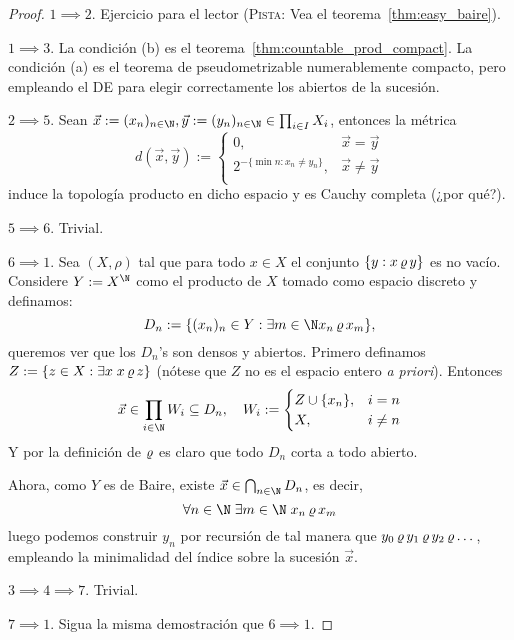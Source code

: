 \documentclass[topologia-analisis.tex]{subfiles}
\begin{document}
\begin{proof}
	$1\implies 2$. Ejercicio para el lector (\textsc{Pista:} Vea el teorema~\ref{thm:easy_baire}).
	\par
	$1\implies 3$. La condición (b) es el teorema~\ref{thm:countable_prod_compact}.
	La condición (a) es el teorema de pseudometrizable numerablemente compacto, pero empleando el DE para elegir correctamente los abiertos
	de la sucesión.

	$2\implies 5$. Sean $\vec x := (x_n)_{n\in\N}, \vec y := (y_n)_{n\in\N} \in \prod_{i\in I} X_i$, entonces la métrica
	$$ d( \vec x, \vec y ) :=
	\begin{cases}
		0, & \vec x = \vec y \\
		2^{-\{\min n : x_n \ne y_n\}}, & \vec x \ne \vec y \\
	\end{cases} $$
	induce la topología producto en dicho espacio y es Cauchy completa (¿por qué?).

	$5 \implies 6$. Trivial.
	\par
	$6 \implies 1$. Sea $(X, \rho)$ tal que para todo $x \in X$ el conjunto $\{ y : x\operatorname{\varrho} y \}$ es no vacío.
	Considere $Y := X^\N$ como el producto de $X$ tomado como espacio discreto y definamos:
	$$ D_n := \{ (x_n)_n \in Y : \exists m\in\N x_n\orho x_m \}, $$
	queremos ver que los $D_n$'s son densos y abiertos.
	Primero definamos $Z := \{ z\in X : \exists x \; x\operatorname{\varrho} z \}$ (nótese que $Z$ no es el espacio entero \textit{a priori}).
	Entonces
	$$ \vec x \in \prod_{i\in\N} W_i \subseteq D_n, \quad
	W_i :=
	\begin{cases}
		Z\cup\{x_n\}, &i = n \\
		X, &i \ne n
	\end{cases} $$
	Y por la definición de $\operatorname{\varrho}$ es claro que todo $D_n$ corta a todo abierto.

	Ahora, como $Y$ es de Baire, existe $\vec x \in \bigcap_{n\in\N} D_n$, es decir,
	$$ \forall n\in\N\; \exists m\in\N \; x_n \orho x_m $$
	luego podemos construir $y_n$ por recursión de tal manera que $y_0\operatorname{\varrho} y_1\operatorname{\varrho} y_2\operatorname{\varrho}\dots$,
	empleando la minimalidad del índice sobre la sucesión $\vec x$.

	$3\implies 4\implies 7$. Trivial.
	\par
	$7\implies 1$. Sigua la misma demostración que $6\implies 1$.
\end{proof}

\end{document}
